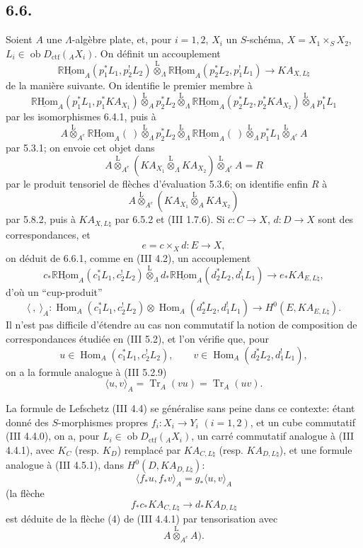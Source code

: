 \documentclass[11pt]{article}
\DeclareMathOperator{\Hom}{Hom}
\newcommand{\R}{\mathbb{R}}\newcommand{\RHomCore}{\mathbb{R}\mathrm{Hom}}
\providecommand{\RHom}{\RHomCore}
\providecommand{\uRHom}{\underline{\RHom}}
\providecommand{\Tr}{\operatorname{Tr}}
\providecommand{\Tr}{\operatorname{Tr}}
\providecommand{\lten}{\overset{\mathrm L}{\otimes}}
\providecommand{\Ob}{\operatorname{ob}}
\providecommand{\Tr}{\operatorname{Tr}}
\providecommand{\RHom}{\RHomCore}
\providecommand{\Hom}{\operatorname{Hom}}
\providecommand{\lten}{\overset{\mathrm L}{\otimes}}
\providecommand{\RHom}{\R\mathcal{H}om}
\providecommand{\lten}{\overset{\mathrm L}{\otimes}}
\providecommand{\Ob}{\operatorname{ob}}
\providecommand{\R}{\mathrm R}
\providecommand{\Tr}{\operatorname{Tr}}
\providecommand{\lten}{\overset{\mathrm L}{\otimes}}
\providecommand{\lten}{\overset{\mathrm L}{\otimes}}
\providecommand{\Ob}{\operatorname{Ob}}
\providecommand{\lten}{\overset{\mathrm L}{\otimes}}
\providecommand{\RHom}{\RHomCore}
\providecommand{\Hom}{\operatorname{Hom}}
\providecommand{\Tr}{\operatorname{Tr}}
\providecommand{\Ob}{\operatorname{ob}}
\providecommand{\Ob}{\operatorname{Ob}}
\providecommand{\lten}{\overset{\mathrm L}{\otimes}}
\begin{document}
\subsection*{6.6.}
Soient $A$ une $\Lambda$-algèbre plate, et, pour $i=1,2$, $X_i$ un $S$-schéma, $X=X_1\times_SX_2$, $L_i\in\Ob D_{\mathrm{ctf}}({}_AX_i)$. On définit un accouplement
\begin{equation}
\uRHom_A(p_1^*L_1,p_2^!L_2)
\lten_{\Lambda}
\uRHom_A(p_2^*L_2,p_1^!L_1)
\longrightarrow
KA_{X,L\natural}
\tag{6.6.1}
\end{equation}
de la manière suivante. On identifie le premier
membre à
\[
\uRHom_A(p_1^*L_1,p_1^*KA_{X_1})
\lten_A p_2^*L_2
\lten_{\Lambda}
\uRHom_A(p_2^*L_2,p_2^*KA_{X_2})
\lten_A p_1^*L_1
\]
par les isomorphismes 6.4.1, puis à
\[
A\lten_{A^e}\uRHom_A(\ )\lten_{\Lambda}p_2^*L_2
 \lten_{\Lambda}\uRHom_A(\ )\lten_{\Lambda}p_1^*L_1\lten_{A^e}A
\]
par 5.3.1; on envoie cet objet dans
\[
A\lten_{A^e}(KA_{X_1}\lten_{\Lambda}KA_{X_2})\lten_{A^e}A=R
\]
par le produit tensoriel de flèches d'évaluation 5.3.6; on identifie enfin $R$ à
\[
A\lten_{A^e}(KA_{X_1}\lten_A KA_{X_2})
\]
par 5.8.2, puis à $KA_{X,L\natural}$ par 6.5.2 et (III 1.7.6). Si $c:C\to X$, $d:D\to X$ sont des correspondances, et
\[
e=c\times_Xd:E\to X,
\]
on déduit de 6.6.1, comme en (III 4.2), un accouplement
\begin{equation}
c_*\uRHom_A(c_1^*L_1,c_2^!L_2)
\lten_{\Lambda}
d_*\uRHom_A(d_2^*L_2,d_1^!L_1)
\longrightarrow
e_*KA_{E,L\natural},
\tag{6.6.2}
\end{equation}
d'où un ``cup-produit''
\begin{equation}
\langle\ ,\ \rangle_A:
\Hom_A(c_1^*L_1,c_2^!L_2)\otimes
\Hom_A(d_2^*L_2,d_1^!L_1)
\longrightarrow
H^0(E,KA_{E,L\natural}).
\tag{6.6.3}
\end{equation}
Il n'est pas difficile d'étendre au cas non commutatif la notion de composition de correspondances étudiée en (III 5.2), et l'on vérifie que, pour
\[
u\in\Hom_A(c_1^*L_1,c_2^!L_2),\qquad
v\in\Hom_A(d_2^*L_2,d_1^!L_1),
\]
on a la formule analogue à (III 5.2.9)
\begin{equation}
\langle u,v\rangle_A=\Tr_A(vu)=\Tr_A(uv).
\tag{6.6.4}
\end{equation}

La formule de Lefschetz (III 4.4) se généralise sans peine dans ce contexte: étant donné des $S$-morphismes propres $f_i:X_i\to Y_i$ $(i=1,2)$, et un cube commutatif (III 4.4.0), on a, pour $L_i\in\Ob D_{\mathrm{ctf}}({}_AX_i)$, un carré commutatif analogue à (III 4.4.1), avec $K_C$ (resp. $K_D$) remplacé par $KA_{C,L\natural}$ (resp. $KA_{D,L\natural}$), et une formule analogue à (III 4.5.1), dans $H^0(D,KA_{D,L\natural})$:
\begin{equation}
\langle f_*u,f_*v\rangle_A=g_*\langle u,v\rangle_A
\tag{6.6.5}
\end{equation}
(la flèche
\[
f_*c_*KA_{C,L\natural}\longrightarrow d_*KA_{D,L\natural}
\]
est déduite de la flèche (4) de (III 4.4.1) par tensorisation avec
\[
A\lten_{A^e}A) .
\]
\end{document}
